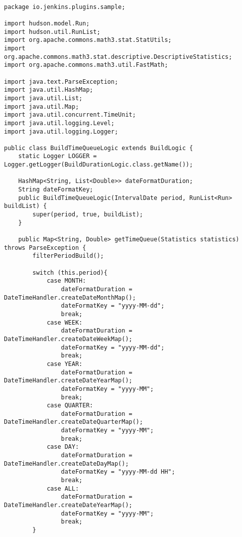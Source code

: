 \begin{lstlisting}

package io.jenkins.plugins.sample;

import hudson.model.Run;
import hudson.util.RunList;
import org.apache.commons.math3.stat.StatUtils;
import org.apache.commons.math3.stat.descriptive.DescriptiveStatistics;
import org.apache.commons.math3.util.FastMath;

import java.text.ParseException;
import java.util.HashMap;
import java.util.List;
import java.util.Map;
import java.util.concurrent.TimeUnit;
import java.util.logging.Level;
import java.util.logging.Logger;

public class BuildTimeQueueLogic extends BuildLogic {
    static Logger LOGGER = Logger.getLogger(BuildDurationLogic.class.getName());

    HashMap<String, List<Double>> dateFormatDuration;
    String dateFormatKey;
    public BuildTimeQueueLogic(IntervalDate period, RunList<Run> buildList) {
        super(period, true, buildList);
    }

    public Map<String, Double> getTimeQueue(Statistics statistics) throws ParseException {
        filterPeriodBuild();

        switch (this.period){
            case MONTH:
                dateFormatDuration = DateTimeHandler.createDateMonthMap();
                dateFormatKey = "yyyy-MM-dd";
                break;
            case WEEK:
                dateFormatDuration = DateTimeHandler.createDateWeekMap();
                dateFormatKey = "yyyy-MM-dd";
                break;
            case YEAR:
                dateFormatDuration = DateTimeHandler.createDateYearMap();
                dateFormatKey = "yyyy-MM";
                break;
            case QUARTER:
                dateFormatDuration = DateTimeHandler.createDateQuarterMap();
                dateFormatKey = "yyyy-MM";
                break;
            case DAY:
                dateFormatDuration = DateTimeHandler.createDateDayMap();
                dateFormatKey = "yyyy-MM-dd HH";
                break;
            case ALL:
                dateFormatDuration = DateTimeHandler.createDateYearMap();
                dateFormatKey = "yyyy-MM";
                break;
        }



\end{lstlisting}
